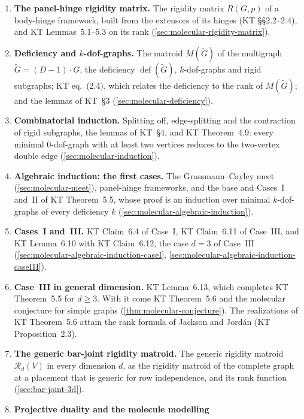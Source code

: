 \begin{enumerate}
  \item \textbf{The panel-hinge rigidity matrix.} The rigidity matrix
        $R(G,p)$ of a body-hinge framework, built from the extensors of
        its hinges (KT \S\S2.2--2.4), and KT Lemmas~5.1--5.3 on its rank
        (\cref{sec:molecular-rigidity-matrix}).
  \item \textbf{Deficiency and $k$-dof-graphs.} The matroid
        $M(\tilde G)$ of the multigraph $\tilde G = (D-1)\cdot G$, the
        deficiency $\operatorname{def}(\tilde G)$, $k$-dof-graphs and
        rigid subgraphs; KT eq.~(2.4), which relates the deficiency to the
        rank of $M(\tilde G)$; and the lemmas of KT~\S3
        (\cref{sec:molecular-deficiency}).
  \item \textbf{Combinatorial induction.} Splitting off, edge-splitting
        and the contraction of rigid subgraphs, the lemmas of KT~\S4, and
        KT Theorem~4.9: every minimal $0$-dof-graph with at least two
        vertices reduces to the two-vertex double edge
        (\cref{sec:molecular-induction}).
  \item \textbf{Algebraic induction: the first cases.} The
        Grassmann--Cayley meet (\cref{sec:molecular-meet}), panel-hinge
        frameworks, and the base and Cases~I and~II of KT Theorem~5.5,
        whose proof is an induction over minimal $k$-dof-graphs of every
        deficiency $k$ (\cref{sec:molecular-algebraic-induction}).
  \item \textbf{Cases~I and~III.} KT Claim~6.4 of Case~I, KT Claim~6.11
        of Case~III, and KT Lemma~6.10 with KT Claim~6.12, the case
        $d = 3$ of Case~III (\cref{sec:molecular-algebraic-induction-caseI},
        \cref{sec:molecular-algebraic-induction-caseIII}).
  \item \textbf{Case~III in general dimension.} KT Lemma~6.13, which
        completes KT Theorem~5.5 for $d \ge 3$. With it come KT
        Theorem~5.6 and the molecular conjecture for simple graphs
        (\cref{thm:molecular-conjecture}). The realizations of KT
        Theorem~5.6 attain the rank formula of Jackson and Jord\'an
        (KT Proposition~2.3).
  \item \textbf{The generic bar-joint rigidity matroid.} The generic
        rigidity matroid $\mathcal{R}_d(V)$ in every dimension $d$, as the
        rigidity matroid of the complete graph at a placement that is
        generic for row independence, and its rank function
        (\cref{sec:bar-joint-3d}).
  \item \textbf{Projective duality and the molecule modelling
}
\end{enumerate}

